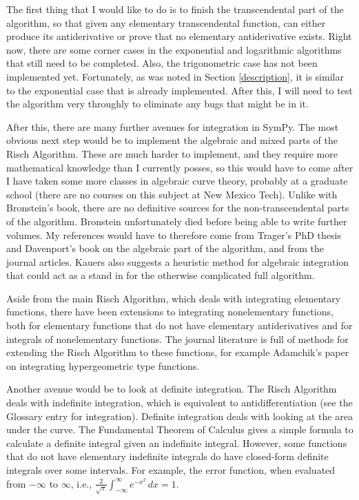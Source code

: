 The first thing that I would like to do is to finish the
\gls{transcendental} part of the algorithm, so that given any
\gls{elementary} \gls{transcendental} function, \rischintegrate{} can
either produce its antiderivative or prove that no \gls{elementary}
antiderivative exists.  Right now, there are some corner cases in the
exponential and logarithmic algorithms that still need to be completed. 
Also, the trigonometric case has not been implemented yet.  Fortunately,
as was noted in Section \ref{description}, it is similar to the
exponential case that is already implemented.  After this, I will need
to test the algorithm very throughly to eliminate any bugs that might be
in it.

After this, there are many further avenues for \gls{integration} in
SymPy.  The most obvious next step would be to implement the algebraic
and mixed parts of the Risch Algorithm.  These are much harder to
implement, and they require more mathematical knowledge than I currently
posses, so this would have to come after I have taken some more classes
in algebraic curve theory, probably at a graduate school (there are no
courses on this subject at New Mexico Tech).  Unlike with Bronstein's
book, there are no definitive sources for the non-\gls{transcendental}
parts of the algorithm.  Bronstein unfortunately died before being able
to write further volumes.  My references would have to therefore come
from Trager's PhD thesis \cite{trager1984integration} and Davenport's
book \cite{davenport1984integration} on the algebraic part of the
algorithm, and from the journal articles.  Kauers
\cite{kauers2008integration} also suggests a heuristic method for
\gls{algebraic} \gls{integration} that could act as a stand in for the
otherwise complicated full algorithm.

Aside from the main Risch Algorithm, which deals with integrating
\gls{elementary} functions, there have been extensions to integrating
nonelementary functions, both for \gls{elementary} functions that do not
have \gls{elementary} antiderivatives and for integrals of nonelementary
functions.  The journal literature is full of methods for extending the
Risch Algorithm to these functions, for example Adamchik's paper
\cite{adamchik1990hypergeometric} on integrating hypergeometric type
functions.

Another avenue would be to look at definite \gls{integration}.  The
Risch Algorithm deals with indefinite \gls{integration}, which is
equivalent to antidifferentiation (see the Glossary entry for
\gls{integration}).  Definite \gls{integration} deals with looking at
the area under the curve.  The Fundamental Theorem of Calculus gives a
simple formula to calculate a definite integral given an indefinite
integral.  However, some functions that do not have \gls{elementary}
indefinite integrals do have closed-form definite integrals over some
intervals.  For example, the \gls{error function}, when evaluated from
$-\infty$ to $\infty$, i.e.,
$\frac{2}{\sqrt{\pi}}\int_{-\infty}^\infty{e^{-x^2}\,dx}=1$.

